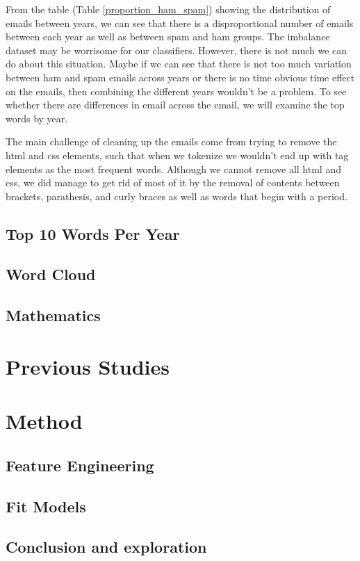 \documentclass[12pt]{article}
\begin{document}
From the table (Table \ref{proportion_ham_spam}) showing the distribution of emails between years, we can see that there is a disproportional number of emails between each year as well as between spam and ham groups. The imbalance dataset may be worrisome for our classifiers. However, there is not much we can do about this situation. Maybe if we can see that there is not too much variation between ham and spam emails across years or there is no time obvious time effect on the emails, then combining the different years wouldn't be a problem. To see whether there are differences in email across the email, we will examine the top words by year. 

The main challenge of cleaning up the emails come from trying to remove the html and css elements, such that when we tokenize we wouldn't end up with tag elements as the most frequent words. Although we cannot remove all html and css, we did manage to get rid of most of it by the removal of contents between brackets, parathesis, and curly braces as well as words that begin with a period.  

%


\subsection{Top 10 Words Per Year}



\subsection{Word Cloud}

\subsection{Mathematics}

\section{Previous Studies}

\section{Method}

\subsection{Feature Engineering}

\subsection{Fit Models}

\subsection{Conclusion and exploration}
\end{document}
